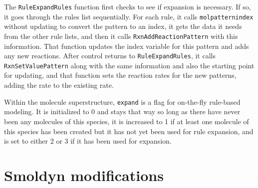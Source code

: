 \documentclass {book}
\begin{document}
The \texttt{RuleExpandRules} function first checks to see if expansion is necessary.  If so, it goes through the rules list sequentially.  For each rule, it calls \texttt{molpatternindex} without updating to convert the pattern to an index, it gets the data it needs from the other rule lists, and then it calls \texttt{RxnAddReactionPattern} with this information.  That function updates the index variable for this pattern and adds any new reactions.  After control returns to \texttt{RuleExpandRules}, it calls \texttt{RxnSetValuePattern} along with the same information and also the starting point for updating, and that function sets the reaction rates for the new patterns, adding the rate to the existing rate.

Within the molecule superstructure, \texttt{expand} is a flag for on-the-fly rule-based modeling.  It is initialized to 0 and stays that way so long as there have never been any molecules of this species, it is increased to 1 if at least one molecule of this species has been created but it has not yet been used for rule expansion, and is set to either 2 or 3 if it has been used for expansion.


\chapter{Smoldyn modifications}

\renewcommand{\labelitemi}{$\cdot$}
\end{document}
